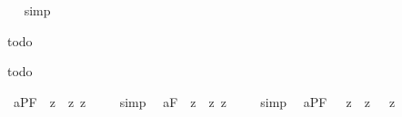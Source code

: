 \begin{isabellebody}
\isadelimproof
\ %
\endisadelimproof
%
\isatagproof
{}\isamarkupfalse%
\ simp\ \isamarkupfalse%
%
\endisatagproof
{\isafoldproof}%
%
\isadelimproof
%
\endisadelimproof
%
\isamarkuptrue%
%
\begin{isamarkuptext}%
todo%
\end{isamarkuptext}%
\isamarkuptrue%
%
\isamarkuptrue%
%
\begin{isamarkuptext}%
todo%
\end{isamarkuptext}%
\isamarkuptrue%
%
\isamarkuptrue%
\isamarkupfalse%
\ a{}{}{\isacharunderscore}{}{\isacharunderscore}PF{\isacharcolon}\ {\isachardoublequoteopen}{\isacharbrackleft}{\isasymA}\ {\isacharparenleft}{\isasymnot}\isactrlsup z\ {\isacharcomma}{\isasymphi}{\isacharcomma}{\isacharparenright}\ {\isasymequiv}\isactrlsup z\ {\isacharparenleft}{\isasymnot}\isactrlsup z\ {\isacharparenleft}{\isasymA}\ {\isacharcomma}{\isasymphi}{\isacharcomma}{\isacharparenright}{\isacharparenright}{\isacharbrackright}{\isachardoublequoteclose}%
\isadelimproof
\ %
\endisadelimproof
%
\isatagproof
{}\isamarkupfalse%
\ simp\ \isamarkupfalse%
%
\endisatagproof
{\isafoldproof}%
%
\isadelimproof
%
\endisadelimproof
\isanewline
{}\isamarkupfalse%
\ a{}{}{\isacharunderscore}{}{\isacharunderscore}F{\isacharcolon}\ {\isachardoublequoteopen}{\isacharbrackleft}{\isasymA}\ {\isacharparenleft}{\isasymnot}\isactrlsup z\ {\isacharsemicolon}{\isasymphi}{\isacharsemicolon}{\isacharparenright}\ {\isasymequiv}\isactrlsup z\ {\isacharparenleft}{\isasymnot}\isactrlsup z\ {\isacharparenleft}{\isasymA}\ {\isacharsemicolon}{\isasymphi}{\isacharsemicolon}{\isacharparenright}{\isacharparenright}{\isacharbrackright}{\isachardoublequoteclose}%
\isadelimproof
\ %
\endisadelimproof
%
\isatagproof
{}\isamarkupfalse%
\ simp\ \isamarkupfalse%
%
\endisatagproof
{\isafoldproof}%
%
\isadelimproof
%
\endisadelimproof
\isanewline
{}\isamarkupfalse%
\ a{}{}{\isacharunderscore}{}{\isacharunderscore}PF{\isacharcolon}\ {\isachardoublequoteopen}{\isacharbrackleft}{\isasymA}\ {\isacharparenleft}{\isacharcomma}{\isasymphi}{\isacharcomma}\ {\isasymrightarrow}\isactrlsup z\ {\isacharcomma}{\isasympsi}{\isacharcomma}{\isacharparenright}\ {\isasymequiv}\isactrlsup z\ {\isacharparenleft}{\isasymA}\ {\isacharcomma}{\isasymphi}{\isacharcomma}\ {\isasymrightarrow}\isactrlsup z\ {\isasymA}\ {\isacharcomma}{\isasympsi}{\isacharcomma}{\isacharparenright}{\isacharbrackright}{\isachardoublequoteclose}%

\end{isabellebody}
